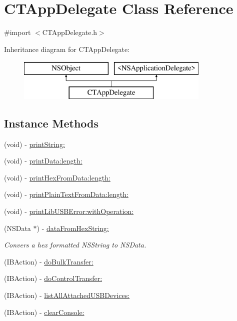 \hypertarget{interface_c_t_app_delegate}{\section{C\-T\-App\-Delegate Class Reference}
\label{interface_c_t_app_delegate}
}


{\ttfamily \#import $<$C\-T\-App\-Delegate.\-h$>$}

Inheritance diagram for C\-T\-App\-Delegate\-:\begin{figure}[H]
\begin{center}
\leavevmode
\includegraphics[height=2.000000cm]{interface_c_t_app_delegate}
\end{center}
\end{figure}
\subsection*{Instance Methods}
\begin{DoxyCompactItemize}
\item 
(void) -\/ \hyperlink{interface_c_t_app_delegate_addd3afab284b71398cf768928236ec86}{print\-String\-:}
\item 
(void) -\/ \hyperlink{interface_c_t_app_delegate_ac775ffc73129f7d3ff35305d9341a831}{print\-Data\-:length\-:}
\item 
(void) -\/ \hyperlink{interface_c_t_app_delegate_aa1ff2bd3f654a541d2790cf4ebc36386}{print\-Hex\-From\-Data\-:length\-:}
\item 
(void) -\/ \hyperlink{interface_c_t_app_delegate_adc5dedd1eee0e8b1fc126764f1f242dd}{print\-Plain\-Text\-From\-Data\-:length\-:}
\item 
(void) -\/ \hyperlink{interface_c_t_app_delegate_ae7974427860f64ab0225f32237b11179}{print\-Lib\-U\-S\-B\-Error\-:with\-Operation\-:}
\item 
(N\-S\-Data $\ast$) -\/ \hyperlink{interface_c_t_app_delegate_ae71bc249cd087494e9b00e49988b5b55}{data\-From\-Hex\-String\-:}
\begin{DoxyCompactList}\small\item\em Convers a hex formatted N\-S\-String to N\-S\-Data. \end{DoxyCompactList}\item 
(I\-B\-Action) -\/ \hyperlink{interface_c_t_app_delegate_a0061d4cbac40771a21e02323bedbf32b}{do\-Bulk\-Transfer\-:}
\item 
(I\-B\-Action) -\/ \hyperlink{interface_c_t_app_delegate_a5589f0a49987a2edffcf4aac85077d28}{do\-Control\-Transfer\-:}
\item 
(I\-B\-Action) -\/ \hyperlink{interface_c_t_app_delegate_a21bf37f0abad2c4ba4728db09b3eb6e5}{list\-All\-Attached\-U\-S\-B\-Devices\-:}
\item 
(I\-B\-Action) -\/ \hyperlink{interface_c_t_app_delegate_ae6fb4f8759991c57bfdd0eb1c89821e3}{clear\-Console\-:}
\end{DoxyCompactItemize}
